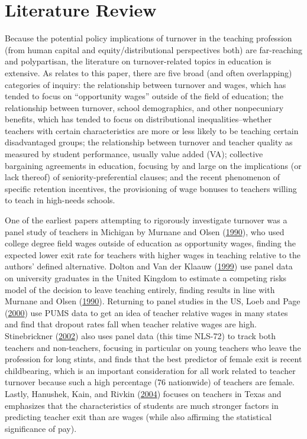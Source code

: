 \documentclass[12pt,]{article}
\newcommand{\TAG}[1]{}
\begin{document}
\TAG{END_INTRO}

\section{Literature Review}\label{literature-review}

\TAG{BEGIN_BODY}

Because the potential policy implications of turnover in the teaching
profession (from human capital and equity/distributional perspectives
both) are far-reaching and polypartisan, the literature on
turnover-related topics in education is extensive. As relates to this
paper, there are five broad (and often overlapping) categories of
inquiry: the relationship between turnover and wages, which has tended
to focus on ``opportunity wages'' outside of the field of education; the
relationship between turnover, school demographics, and other
nonpecuniary benefits, which has tended to focus on distributional
inequalities--whether teachers with certain characteristics are more or
less likely to be teaching certain disadvantaged groups; the
relationship between turnover and teacher quality as measured by student
performance, usually value added (VA); collective bargaining agreements
in education, focusing by and large on the implications (or lack
thereof) of seniority-preferential clauses; and the recent phenomenon of
specific retention incentives, the provisioning of wage bonuses to
teachers willing to teach in high-needs schools.

One of the earliest papers attempting to rigorously investigate turnover
was a panel study of teachers in Michigan by Murnane and Olsen
(\protect\hyperlink{ref-murnane}{1990}), who used college degree field
wages outside of education as opportunity wages, finding the expected
lower exit rate for teachers with higher wages in teaching relative to
the authors' defined alternative. Dolton and Van der Klaauw
(\protect\hyperlink{ref-dolton}{1999}) use panel data on university
graduates in the United Kingdom to estimate a competing risks model of
the decision to leave teaching entirely, finding results in line with
Murnane and Olsen (\protect\hyperlink{ref-murnane}{1990}). Returning to
panel studies in the US, Loeb and Page
(\protect\hyperlink{ref-loeb}{2000}) use PUMS data to get an idea of
teacher relative wages in many states and find that dropout rates fall
when teacher relative wages are high. Stinebrickner
(\protect\hyperlink{ref-stinebrickner}{2002}) also uses panel data (this
time NLS-72) to track both teachers and non-teachers, focusing in
particular on young teachers who leave the profession for long stints,
and finds that the best predictor of female exit is recent childbearing,
which is an important consideration for all work related to teacher
turnover because such a high percentage (76 nationwide) of teachers are
female. Lastly, Hanushek, Kain, and Rivkin
(\protect\hyperlink{ref-hanushek}{2004}) focuses on teachers in Texas
and emphasizes that the characteristics of students are much stronger
factors in predicting teacher exit than are wages (while also affirming
the statistical significance of pay).
\end{document}
